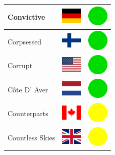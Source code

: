\documentclass[12pt, a4paper, twoside]{report}
\begin{document}
\begin{center}
\begin{longtable}{|p{5cm}|p{2cm}|p{2cm}|}
 Convictive                                                 & \includegraphics[width=1cm]{../img/flags/de} &   \includegraphics[width=1cm]{../likes/y} \\ \hline
 Corpsessed                                                 & \includegraphics[width=1cm]{../img/flags/fi} &   \includegraphics[width=1cm]{../likes/y} \\ \hline
 Corrupt                                                    & \includegraphics[width=1cm]{../img/flags/us} &   \includegraphics[width=1cm]{../likes/y} \\ \hline
 Côte D' Aver                                               & \includegraphics[width=1cm]{../img/flags/nl} &   \includegraphics[width=1cm]{../likes/y} \\ \hline
 Counterparts                                               & \includegraphics[width=1cm]{../img/flags/ca} &   \includegraphics[width=1cm]{../likes/m} \\ \hline
 Countless Skies                                            & \includegraphics[width=1cm]{../img/flags/gb} &   \includegraphics[width=1cm]{../likes/m} \\ \hline

\end{longtable}
\end{center}
\end{document}
